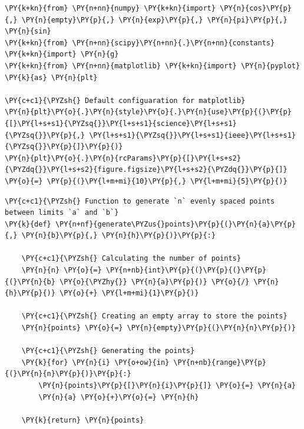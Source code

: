     \begin{tcolorbox}[breakable, size=fbox, boxrule=1pt, pad at break*=1mm,colback=cellbackground, colframe=cellborder]
\begin{Verbatim}[commandchars=\\\{\}]
\PY{k+kn}{from} \PY{n+nn}{numpy} \PY{k+kn}{import} \PY{n}{cos}\PY{p}{,} \PY{n}{empty}\PY{p}{,} \PY{n}{exp}\PY{p}{,} \PY{n}{pi}\PY{p}{,} \PY{n}{sin}
\PY{k+kn}{from} \PY{n+nn}{scipy}\PY{n+nn}{.}\PY{n+nn}{constants} \PY{k+kn}{import} \PY{n}{g}
\PY{k+kn}{from} \PY{n+nn}{matplotlib} \PY{k+kn}{import} \PY{n}{pyplot} \PY{k}{as} \PY{n}{plt}

\PY{c+c1}{\PYZsh{} Default configuaration for matplotlib}
\PY{n}{plt}\PY{o}{.}\PY{n}{style}\PY{o}{.}\PY{n}{use}\PY{p}{(}\PY{p}{[}\PY{l+s+s1}{\PYZsq{}}\PY{l+s+s1}{science}\PY{l+s+s1}{\PYZsq{}}\PY{p}{,} \PY{l+s+s1}{\PYZsq{}}\PY{l+s+s1}{ieee}\PY{l+s+s1}{\PYZsq{}}\PY{p}{]}\PY{p}{)}
\PY{n}{plt}\PY{o}{.}\PY{n}{rcParams}\PY{p}{[}\PY{l+s+s2}{\PYZdq{}}\PY{l+s+s2}{figure.figsize}\PY{l+s+s2}{\PYZdq{}}\PY{p}{]} \PY{o}{=} \PY{p}{(}\PY{l+m+mi}{10}\PY{p}{,} \PY{l+m+mi}{5}\PY{p}{)}
\end{Verbatim}
\end{tcolorbox}

    \begin{tcolorbox}[breakable, size=fbox, boxrule=1pt, pad at break*=1mm,colback=cellbackground, colframe=cellborder]
\begin{Verbatim}[commandchars=\\\{\}]
\PY{c+c1}{\PYZsh{} Function to generate `n` evenly spaced points between limits `a` and `b`}
\PY{k}{def} \PY{n+nf}{generate\PYZus{}points}\PY{p}{(}\PY{n}{a}\PY{p}{,} \PY{n}{b}\PY{p}{,} \PY{n}{h}\PY{p}{)}\PY{p}{:}

    \PY{c+c1}{\PYZsh{} Calculating the number of points}
    \PY{n}{n} \PY{o}{=} \PY{n+nb}{int}\PY{p}{(}\PY{p}{(}\PY{p}{(}\PY{n}{b} \PY{o}{\PYZhy{}} \PY{n}{a}\PY{p}{)} \PY{o}{/} \PY{n}{h}\PY{p}{)} \PY{o}{+} \PY{l+m+mi}{1}\PY{p}{)}

    \PY{c+c1}{\PYZsh{} Creating an empty array to store the points}
    \PY{n}{points} \PY{o}{=} \PY{n}{empty}\PY{p}{(}\PY{n}{n}\PY{p}{)}

    \PY{c+c1}{\PYZsh{} Generating the points}
    \PY{k}{for} \PY{n}{i} \PY{o+ow}{in} \PY{n+nb}{range}\PY{p}{(}\PY{n}{n}\PY{p}{)}\PY{p}{:}
        \PY{n}{points}\PY{p}{[}\PY{n}{i}\PY{p}{]} \PY{o}{=} \PY{n}{a}
        \PY{n}{a} \PY{o}{+}\PY{o}{=} \PY{n}{h}

    \PY{k}{return} \PY{n}{points}
\end{Verbatim}
\end{tcolorbox}

